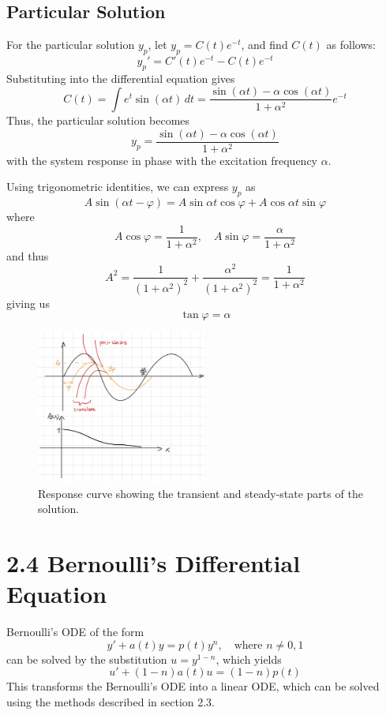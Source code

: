 \documentclass[11pt]{article}
\begin{document}
\subsection*{Particular Solution}
For the particular solution \( y_p \), let \( y_p = C(t)e^{-t} \), and find \( C(t) \) as follows:
\[ y_p' = C'(t)e^{-t} - C(t)e^{-t} \]
Substituting into the differential equation gives
\[ C(t) = \int e^{t} \sin(\alpha t) \, dt = \frac{\sin(\alpha t) - \alpha \cos(\alpha t)}{1 + \alpha^2} e^{-t} \]
Thus, the particular solution becomes
\[ y_p = \frac{\sin(\alpha t) - \alpha \cos(\alpha t)}{1 + \alpha^2} \]
with the system response in phase with the excitation frequency \( \alpha \).

Using trigonometric identities, we can express \( y_p \) as
\[ A \sin(\alpha t - \varphi) = A \sin \alpha t \cos \varphi + A \cos \alpha t \sin \varphi \]
where
\[ A \cos \varphi = \frac{1}{1 + \alpha^2}, \quad A \sin \varphi = \frac{\alpha}{1 + \alpha^2} \]
and thus
\[ A^2 = \frac{1}{(1 + \alpha^2)^2} + \frac{\alpha^2}{(1 + \alpha^2)^2} = \frac{1}{1 + \alpha^2} \]
giving us
\[ \tan \varphi = \alpha \]

\begin{figure}[h!]
\centering
\includegraphics[width=0.5\textwidth]{response_curve.png}
\caption{Response curve showing the transient and steady-state parts of the solution.}
\end{figure}

\section*{2.4 Bernoulli's Differential Equation}
Bernoulli's ODE of the form
\[ y' + a(t)y = p(t)y^n, \quad \text{where } n \neq 0,1 \]
can be solved by the substitution \( u = y^{1-n} \), which yields
\[ u' + (1-n)a(t)u = (1-n)p(t) \]
This transforms the Bernoulli's ODE into a linear ODE, which can be solved using the methods described in section 2.3.
\end{document}
